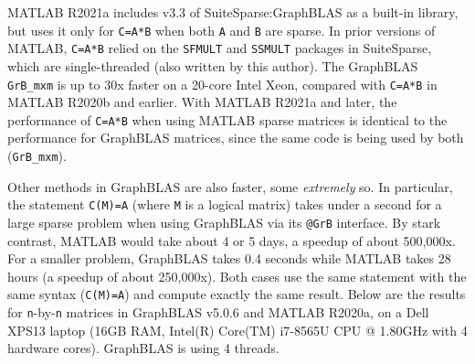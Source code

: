 \documentclass[12pt]{article}
\begin{document}
MATLAB R2021a includes v3.3 of SuiteSparse:GraphBLAS as a built-in library, but
uses it only for \verb'C=A*B' when both \verb'A' and \verb'B' are sparse.  In
prior versions of MATLAB, \verb'C=A*B' relied on the \verb'SFMULT' and
\verb'SSMULT' packages in SuiteSparse, which are single-threaded (also written
by this author).  The GraphBLAS \verb'GrB_mxm' is up to 30x faster on a 20-core
Intel Xeon, compared with \verb'C=A*B' in MATLAB R2020b and earlier.  With
MATLAB R2021a and later, the performance of \verb'C=A*B' when using MATLAB
sparse matrices is identical to the performance for GraphBLAS matrices, since
the same code is being used by both (\verb'GrB_mxm').

Other methods in GraphBLAS are also faster, some {\em extremely} so.  In
particular, the statement \verb'C(M)=A' (where \verb'M' is a logical matrix)
takes under a second for a large sparse problem when using GraphBLAS via its
\verb'@GrB' interface.  By stark contrast, MATLAB would take about 4 or
5 days, a speedup of about 500,000x.  For a smaller problem, GraphBLAS takes
0.4 seconds while MATLAB takes 28 hours (a speedup of about 250,000x).  Both
cases use the same statement with the same syntax (\verb'C(M)=A') and compute
exactly the same result.  Below are the results for \verb'n'-by-\verb'n'
matrices in GraphBLAS v5.0.6 and MATLAB R2020a, on a Dell XPS13 laptop
(16GB RAM, Intel(R) Core(TM) i7-8565U CPU @ 1.80GHz with 4 hardware cores).
GraphBLAS is using 4 threads.
\end{document}
